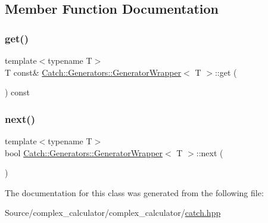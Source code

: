 \subsection{Member Function Documentation}
\mbox{\label{class_catch_1_1_generators_1_1_generator_wrapper_a271f0f905f2c473c907550435b81e102}} 
\subsubsection{\texorpdfstring{get()}{get()}}
{\footnotesize\ttfamily template$<$typename T$>$ \\
T const\& \mbox{\hyperlink{class_catch_1_1_generators_1_1_generator_wrapper}{Catch\+::\+Generators\+::\+Generator\+Wrapper}}$<$ T $>$\+::get (\begin{DoxyParamCaption}{ }\end{DoxyParamCaption}) const\hspace{0.3cm}{\ttfamily [inline]}}

\mbox{\label{class_catch_1_1_generators_1_1_generator_wrapper_acbfdca94811ae02461bd2cf5f60b666e}} 
\subsubsection{\texorpdfstring{next()}{next()}}
{\footnotesize\ttfamily template$<$typename T$>$ \\
bool \mbox{\hyperlink{class_catch_1_1_generators_1_1_generator_wrapper}{Catch\+::\+Generators\+::\+Generator\+Wrapper}}$<$ T $>$\+::next (\begin{DoxyParamCaption}{ }\end{DoxyParamCaption})\hspace{0.3cm}{\ttfamily [inline]}}



The documentation for this class was generated from the following file\+:\begin{DoxyCompactItemize}
\item 
Source/complex\+\_\+calculator/complex\+\_\+calculator/\mbox{\hyperlink{catch_8hpp}{catch.\+hpp}}\end{DoxyCompactItemize}
